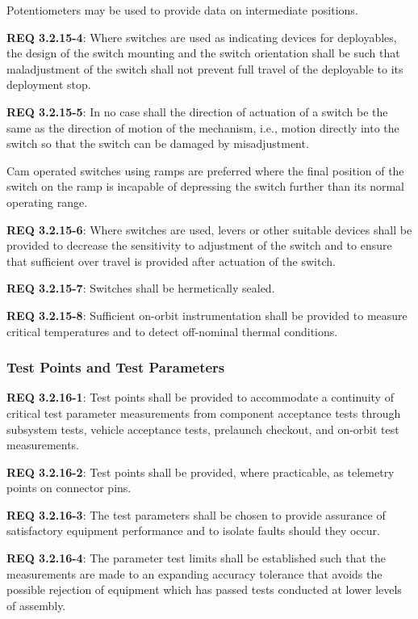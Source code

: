 \documentclass[12pt]{article}
\begin{document}
Potentiometers may be used to provide data on intermediate positions. 

\noindent \textbf{REQ 3.2.15-4}: Where switches are used as indicating devices for deployables, the design of the switch mounting and the switch orientation shall be such that maladjustment of the switch shall not prevent full travel of the deployable to its deployment stop. 

\noindent \textbf{REQ 3.2.15-5}: In no case shall the direction of actuation of a switch be the same as the direction of motion of the mechanism, i.e., motion directly into the switch so that the switch can be damaged by misadjustment. 

Cam operated switches using ramps are preferred where the final position of the switch on the ramp is incapable of depressing the switch further than its normal operating range. 

\noindent \textbf{REQ 3.2.15-6}: Where switches are used, levers or other suitable devices shall be provided to decrease the sensitivity to adjustment of the switch and to ensure that sufficient over travel is provided after actuation of the switch. 

\noindent \textbf{REQ 3.2.15-7}: Switches shall be hermetically sealed. 

\noindent \textbf{REQ 3.2.15-8}: Sufficient on-orbit instrumentation shall be provided to measure critical temperatures and to detect off-nominal thermal conditions.


\subsubsection{Test Points and Test Parameters} %
\noindent \textbf{REQ 3.2.16-1}: Test points shall be provided to accommodate a continuity of critical test parameter measurements from component acceptance tests through subsystem tests, vehicle acceptance tests, prelaunch checkout, and on-orbit test measurements. 

\noindent \textbf{REQ 3.2.16-2}: Test points shall be provided, where practicable, as telemetry points on connector pins. 

\noindent \textbf{REQ 3.2.16-3}: The test parameters shall be chosen to provide assurance of satisfactory equipment performance and to isolate faults should they occur. 

\noindent \textbf{REQ 3.2.16-4}: The parameter test limits shall be established such that the measurements are made to an expanding accuracy tolerance that avoids the possible rejection of equipment which has passed tests conducted at lower levels of assembly. 
\end{document}
